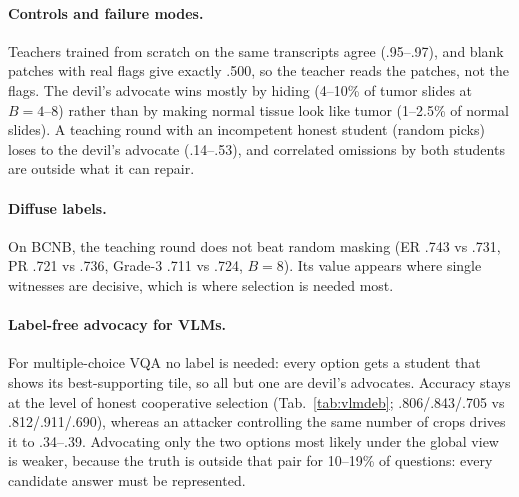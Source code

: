 \documentclass[10pt,twocolumn,letterpaper]{article}
\begin{document}
\paragraph{Controls and failure modes.} Teachers trained from scratch on the same transcripts agree (.95--.97), and blank patches with real flags give exactly .500, so the teacher reads the patches, not the flags. The devil's advocate wins mostly by hiding (4--10\% of tumor slides at $B{=}4$--8) rather than by making normal tissue look like tumor (1--2.5\% of normal slides). A teaching round with an incompetent honest student (random picks) loses to the devil's advocate (.14--.53), and correlated omissions by both students are outside what it can repair.
\paragraph{Diffuse labels.} On BCNB, the teaching round does not beat random masking (ER .743 vs .731, PR .721 vs .736, Grade-3 .711 vs .724, $B{=}8$). Its value appears where single witnesses are decisive, which is where selection is needed most.

\paragraph{Label-free advocacy for VLMs.} \begin{table}[t]\centering\small
\caption{\textbf{One advocate per answer option} (VLM accuracy, 95\% CI; global view always shown). $n$ = number of options. Advocates and attackers choose among the same grid tiles.}\label{tab:vlmdeb}
\setlength{\tabcolsep}{2pt}
\end{table}
For multiple-choice VQA no label is needed: every option gets a student that shows its best-supporting tile, so all but one are devil's advocates. Accuracy stays at the level of honest cooperative selection (Tab.~\ref{tab:vlmdeb}; .806/.843/.705 vs .812/.911/.690), whereas an attacker controlling the same number of crops drives it to .34--.39. Advocating only the two options most likely under the global view is weaker, because the truth is outside that pair for 10--19\% of questions: every candidate answer must be represented.
\end{document}
